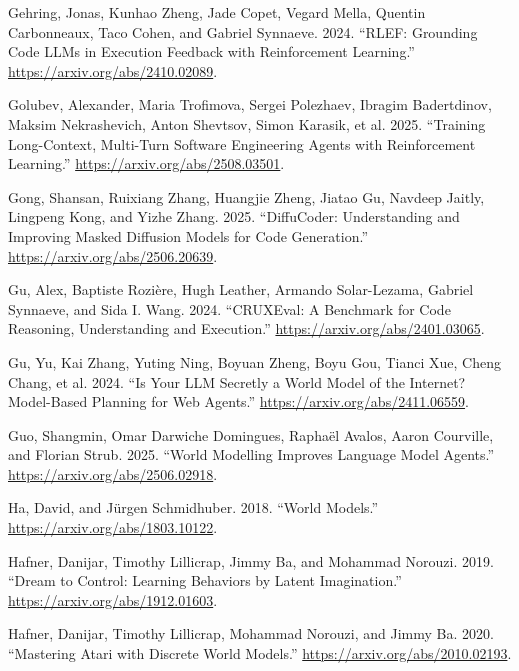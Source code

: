 \documentclass{article}
\newlength{\cslhangindent}
\newenvironment{CSLReferences}[2]
 {%
  \setlength{\parindent}{0pt}
  \everypar{\setlength{\hangindent}{\cslhangindent}}\ignorespaces
 }
 {\par}
\begin{document}
\begin{CSLReferences}{1}{0}
\leavevmode{}%
Gehring, Jonas, Kunhao Zheng, Jade Copet, Vegard Mella, Quentin
Carbonneaux, Taco Cohen, and Gabriel Synnaeve. 2024. {``RLEF: Grounding
Code LLMs in Execution Feedback with Reinforcement Learning.''}
\url{https://arxiv.org/abs/2410.02089}.

\leavevmode{}%
Golubev, Alexander, Maria Trofimova, Sergei Polezhaev, Ibragim
Badertdinov, Maksim Nekrashevich, Anton Shevtsov, Simon Karasik, et al.
2025. {``Training Long-Context, Multi-Turn Software Engineering Agents
with Reinforcement Learning.''} \url{https://arxiv.org/abs/2508.03501}.

\leavevmode{}%
Gong, Shansan, Ruixiang Zhang, Huangjie Zheng, Jiatao Gu, Navdeep
Jaitly, Lingpeng Kong, and Yizhe Zhang. 2025. {``DiffuCoder:
Understanding and Improving Masked Diffusion Models for Code
Generation.''} \url{https://arxiv.org/abs/2506.20639}.

\leavevmode{}%
Gu, Alex, Baptiste Rozière, Hugh Leather, Armando Solar-Lezama, Gabriel
Synnaeve, and Sida I. Wang. 2024. {``CRUXEval: A Benchmark for Code
Reasoning, Understanding and Execution.''}
\url{https://arxiv.org/abs/2401.03065}.

\leavevmode{}%
Gu, Yu, Kai Zhang, Yuting Ning, Boyuan Zheng, Boyu Gou, Tianci Xue,
Cheng Chang, et al. 2024. {``Is Your LLM Secretly a World Model of the
Internet? Model-Based Planning for Web Agents.''}
\url{https://arxiv.org/abs/2411.06559}.

\leavevmode{}%
Guo, Shangmin, Omar Darwiche Domingues, Raphaël Avalos, Aaron Courville,
and Florian Strub. 2025. {``World Modelling Improves Language Model
Agents.''} \url{https://arxiv.org/abs/2506.02918}.

\leavevmode{}%
Ha, David, and Jürgen Schmidhuber. 2018. {``World Models.''}
\url{https://arxiv.org/abs/1803.10122}.

\leavevmode{}%
Hafner, Danijar, Timothy Lillicrap, Jimmy Ba, and Mohammad Norouzi.
2019. {``Dream to Control: Learning Behaviors by Latent Imagination.''}
\url{https://arxiv.org/abs/1912.01603}.

\leavevmode{}%
Hafner, Danijar, Timothy Lillicrap, Mohammad Norouzi, and Jimmy Ba.
2020. {``Mastering Atari with Discrete World Models.''}
\url{https://arxiv.org/abs/2010.02193}.


\end{CSLReferences}
\end{document}
